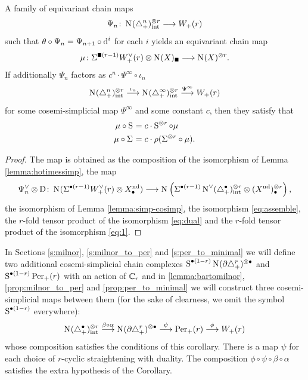 \begin{theorem}\label{thm:milnor_to_minimal}
	A family of equivariant chain maps 
	\[
	\Psi_n\colon \operatorname{N}_{}(\triangle_{+}^{n})^{\otimes r}_{\mathrm{int}} \longrightarrow W_+(r)
	\]
	such that $\theta\circ \Psi_n =  \Psi_{n+1} \circ \operatorname{d}^i$ for each $i$ yields an equivariant chain map
	\[
	\mu\colon \susp{\bs(r-1)}\Wdualaug{r}\ot \chains(X)_\bs\lra \chains(X)^{\ot r}.
	\]
	If additionally $\Psi_n$ factors as $c^n\cdot \Psi^{\infty}\circ \iota_n$
	\[
		\operatorname{N}_{}(\triangle_{+}^n)^{\otimes r}_{\mathrm{\mathrm{int}}}\overset{\iota_n}{\longrightarrow} \operatorname{N}_{}(\triangle_{+}^\infty)^{\otimes r}_{\mathrm{int}} \overset{\Psi^{\infty}}{\longrightarrow} W_+(r)
	\]
	for some cosemi-simplicial map $\Psi^{\infty}$ and some constant $c$,
	then they satisfy that 
	\begin{align*}
		\mu\circ \operatorname{S}^{} &= c\cdot \operatorname{S}^{\otimes r}\circ \mu
		\\
		\mu\circ \Sigma^{} &= c\cdot \rho(\Sigma^{\otimes r}\circ \mu).
	\end{align*}
\end{theorem}
\begin{proof}
	The map is obtained as the composition of the isomorphism of Lemma \ref{lemma:hotimessimp}, the map
	\[
		\Psi_n^\vee\otimes \mathrm{D}\colon \operatorname{N}_{}(\Sigma^{\bullet(r-1)}W^\vee_+(r) \otimes X^{{\mathrm{nd}}}_\bullet) 
		\longrightarrow
		\operatorname{N}_{}\left(\Sigma^{\bullet(r-1)}\operatorname{N}^\vee_{}(\triangle_{+}^\bullet)^{\otimes r}_{\mathrm{int}}\otimes (X^{{\mathrm{nd}}})^{\otimes r}_\bullet\right),	
	\]
	the isomorphism of Lemma \ref{lemma:simp-cosimp}, the isomorphism \eqref{eq:assemble}, the $r$-fold tensor product of the isomorphism \eqref{eq:dual} and the $r$-fold tensor product of the isomorphism \eqref{eq:1}.

	
\end{proof}

In Sections \ref{s:milnor}, \ref{s:milnor_to_per} and \ref{s:per_to_minimal} we will define two additional cosemi-simplicial chain complexes $	\operatorname{S}^{\bullet(1-r) }\operatorname{N}_{}(\partial \triangle_{+}^{r})^{\otimes \bullet}$ and $\operatorname{S}^{\bullet(1-r)}\mathrm{Per}_+(r)$ with an action of $\mathbb{C}_r$ and in \cref{lemma:bartomilnor}, \cref{prop:milnor_to_per} and \cref{prop:per_to_minimal} we will construct three cosemi-simplicial maps between them (for the sake of clearness, we omit the symbol $\operatorname{S}^{\bullet(1-r)}$ everywhere):  
\[
	\operatorname{N}_{}(\triangle_{+}^{\bullet})^{\otimes r}_{\mathrm{int}}
	\overset{\beta\circ \alpha}{\longrightarrow}
	\operatorname{N}_{}(\partial \triangle_{+}^{r})^{\otimes \bullet }
	\overset{\psi}{\longrightarrow}
	\mathrm{Per}_+(r)
	\overset{\phi}{\longrightarrow}
	W_+(r)
\]
whose composition satisfies the conditions of this corollary. There is a map $\psi$ for each choice of $r$-cyclic straightening with duality. The composition $\phi\circ\psi\circ\beta\circ\alpha$ satisfies the extra hypothesis of the Corollary.
